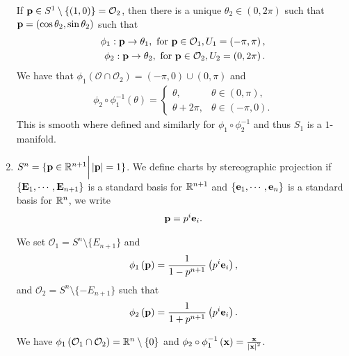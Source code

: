 \begin{examples}
\begin{enumerate}[label=\roman*)]
            If $\vb{p} \in S^{1} \setminus \{\left( 1,0 \right) \} = \mathcal{O}_2$, then there is a unique $\theta_2 \in \left( 0, 2\pi \right) $ such that $\vb{p} = \left( \cos \theta_2, \sin \theta_2 \right) $ such that
            \begin{align}
                \phi_1 : \vb{p} \to \theta_1, \text{~for~} \vb{p} \in \mathcal{O}_1, U_1 = \left( -\pi, \pi \right), \\
                \phi_2 : \vb{p} \to \theta_2, \text{~for~} \vb{p} \in \mathcal{O}_2, U_2 = \left( 0,2\pi \right)
            .\end{align}
            We have that $\phi_1 \left( \mathcal{O} \cap \mathcal{O}_2 \right) = \left( -\pi,0 \right) \cup \left( 0,\pi \right) $ and 
            \begin{align}
                \phi_2 \circ \phi_1^{-1} \left( \theta \right) = \begin{cases}
                    \theta, & \theta \in \left( 0, \pi \right),\\
                    \theta + 2\pi , & \theta \in \left( -\pi,0 \right) .
                \end{cases}
            \end{align}
            This is smooth where defined and similarly for $\phi_1 \circ \phi_2^{-1}$ and thus $S_1$ is a $1$-manifold.
        \item $S^{n} = \{\vb{p} \in \mathbb{R}^{n+1}  \bigg|  \left| \vb{p} \right| = 1\} $.
            We define charts by stereographic projection if $\{\vb{E}_1, \cdots , \vb{E}_{n+1}\} $ is a standard basis for $\mathbb{R}^{n+1}$ and $\{\vb{e}_1, \cdots, \vb{e}_{n}\} $ is a standard basis for $\mathbb{R}^{n}$, we write
            \begin{align}
                \vb{p} = p^{i}\vb{e}_{i}
            .\end{align}

            We set $\mathcal{O}_1 = S^{n} \setminus \{E_{n+1}\} $ and
            \begin{align}
                \phi_1 \left( \vb{p} \right) = \frac{1}{1 - p^{n+1}} \left( p^{i} \vb{e}_{i} \right) 
            ,\end{align}
            and $\mathcal{O}_2 = S^{n} \setminus \{- E_{n+1}\} $ such that
            \begin{align}
                \phi_2 \left( \vb{p} \right) = \frac{1}{1 + p^{n+1}} \left( p^{i}\vb{e}_{i} \right) 
            .\end{align}

            We have $\phi_1 \left( \mathcal{O}_1 \cap \mathcal{O}_2 \right) = \mathbb{R}^{n} \setminus \{0\}  $ and $\phi_2 \circ \phi_1^{-1} \left( \vb{x} \right) = \frac{\vb{x}}{\left| \vb{x} \right|^2 }$. 


\end{enumerate}
\end{examples}
